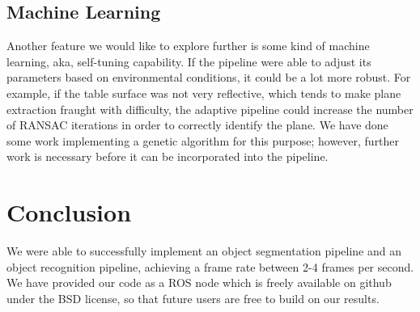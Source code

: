 \documentclass[journal]{IEEEtran}
\begin{document}
\subsection{Machine Learning}Another feature we would like to explore further is some kind of machine learning, aka, self-tuning capability.  If the pipeline were able to adjust its parameters based on environmental conditions, it could be a lot more robust.  For example, if the table surface was not very reflective, which tends to make plane extraction fraught with difficulty, the adaptive pipeline could increase the number of RANSAC iterations in order to correctly identify the plane.  We have done some work implementing a genetic algorithm for this purpose; however, further work is necessary before it can be incorporated into the pipeline. 

\section{Conclusion}
We were able to successfully implement an object segmentation pipeline and an object recognition pipeline, achieving a frame rate between 2-4 frames per second.  We have provided our code as a ROS node which is freely available on github \cite{c44source} under the BSD license, so that future users are free to build on our results.
\end{document}
